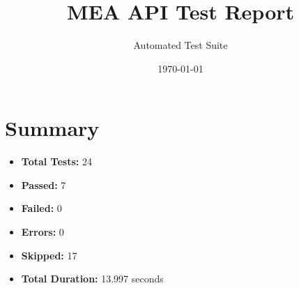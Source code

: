 \documentclass{article}
\title{MEA API Test Report}
\author{Automated Test Suite}
\date{\today}
\begin{document}
\maketitle

\section{Summary}
\begin{itemize}
    \item \textbf{Total Tests:} 24
    \item \textbf{Passed:} 7
    \item \textbf{Failed:} 0
    \item \textbf{Errors:} 0
    \item \textbf{Skipped:} 17
    \item \textbf{Total Duration:} 13.997 seconds
\end{itemize}
\end{document}
